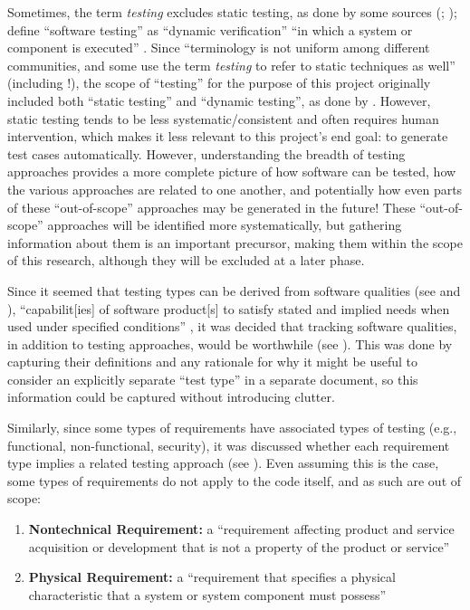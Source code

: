 Sometimes, the term \emph{testing} excludes static testing, as done by some
sources (\citealp[p.~5-1]{SWEBOK2024}; \citealp[p.~222]{AmmannAndOffutt2017});
\citeauthor{IEEE2017} define ``software
testing'' as ``dynamic verification'' ``in which a system or component is
executed'' \citeyearpar[p.~427]{IEEE2017}. Since ``terminology is not uniform
among different communities, and some use the term \emph{testing} to refer to
static techniques as well'' \citep[p.~5-2]{SWEBOK2024} (including
\citet[p.~440]{IEEE2017}!), the scope of ``testing'' for the purpose of this
project originally included both ``static testing'' and ``dynamic testing'', as
done by \citet[p.~17]{IEEE2022}. However, static testing tends to be less
systematic/consistent and often requires human intervention, which makes it
less relevant to this project's end goal: to generate test cases automatically.
However, understanding the breadth of testing approaches provides a more
complete picture of how software can be tested, how the various approaches are
related to one another, and potentially how even parts of these ``out-of-scope''
approaches may be generated in the future! These ``out-of-scope'' approaches
will be identified more systematically, but gathering information about them is
an important precursor, making them within the scope of this research, although
they will be excluded at a later phase.

\label{chap:notes:sec:derived-from-qualities}
Since it seemed that testing types can be derived from software qualities
(see  and ), ``capabilit[ies] of software
product[s] to satisfy stated and implied needs when used under specified
conditions'' \citep[p.~424]{IEEE2017} , it was decided that tracking
software qualities, in addition to testing approaches, would be worthwhile
(see ). This was done by capturing their definitions and any
rationale for why it might be useful to consider an explicitly separate
``test type'' in a separate document, so this information could be captured
without introducing clutter.

Similarly, since some types of requirements have associated types of
testing (e.g., functional, non-functional, security), it was discussed whether
each requirement type implies a related testing approach
(see ). Even assuming this is the case, some types of
requirements do not apply to the code itself, and as such are out of scope:

\begin{enumerate}
      \item \textbf{Nontechnical Requirement:} a ``requirement affecting product
            and service acquisition or development that is not a property of
            the product or service'' \citep[p.~293]{IEEE2017}
      \item \textbf{Physical Requirement:} a ``requirement that specifies a
            physical characteristic that a system or system component must
            possess'' \citep[p.~322]{IEEE2017}
\end{enumerate}


